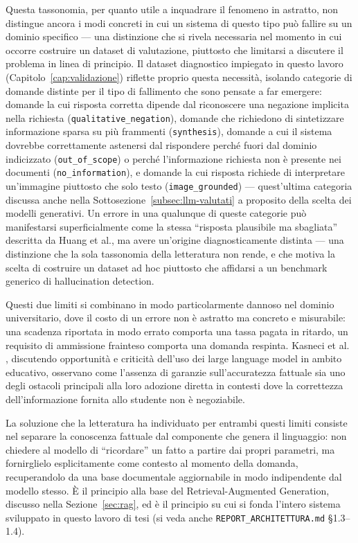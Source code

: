 Questa tassonomia, per quanto utile a inquadrare il fenomeno in astratto, non distingue ancora i modi concreti in cui
un sistema di questo tipo può fallire su un dominio specifico --- una distinzione che si rivela necessaria nel
momento in cui occorre costruire un dataset di valutazione, piuttosto che limitarsi a discutere il problema in linea
di principio. Il dataset diagnostico impiegato in questo lavoro (Capitolo~\ref{cap:validazione}) riflette proprio
questa necessità, isolando categorie di domande distinte per il tipo di fallimento che sono pensate a far emergere:
domande la cui risposta corretta dipende dal riconoscere una negazione implicita nella richiesta
(\texttt{qualitative\_negation}), domande che richiedono di sintetizzare informazione sparsa su più frammenti
(\texttt{synthesis}), domande a cui il sistema dovrebbe correttamente astenersi dal rispondere perché fuori dal
dominio indicizzato (\texttt{out\_of\_scope}) o perché l'informazione richiesta non è presente nei documenti
(\texttt{no\_information}), e domande la cui risposta richiede di interpretare un'immagine piuttosto che solo testo
(\texttt{image\_grounded}) --- quest'ultima categoria discussa anche nella Sottosezione~\ref{subsec:llm-valutati} a
proposito della scelta dei modelli generativi. Un errore in una qualunque di queste categorie può manifestarsi
superficialmente come la stessa ``risposta plausibile ma sbagliata'' descritta da Huang et al., ma avere un'origine
diagnosticamente distinta --- una distinzione che la sola tassonomia della letteratura non rende, e che motiva la
scelta di costruire un dataset ad hoc piuttosto che affidarsi a un benchmark generico di hallucination detection.

Questi due limiti si combinano in modo particolarmente dannoso nel dominio universitario, dove il costo di un errore
non è astratto ma concreto e misurabile: una scadenza riportata in modo errato comporta una tassa pagata in ritardo,
un requisito di ammissione frainteso comporta una domanda respinta. Kasneci et al. \cite{kasneci2023chatgpt},
discutendo opportunità e criticità dell'uso dei large language model in ambito educativo, osservano come l'assenza di
garanzie sull'accuratezza fattuale sia uno degli ostacoli principali alla loro adozione diretta in contesti dove la
correttezza dell'informazione fornita allo studente non è negoziabile.

La soluzione che la letteratura ha individuato per entrambi questi limiti consiste nel separare la conoscenza
fattuale dal componente che genera il linguaggio: non chiedere al modello di ``ricordare'' un fatto a partire dai
propri parametri, ma fornirglielo esplicitamente come contesto al momento della domanda, recuperandolo da una base
documentale aggiornabile in modo indipendente dal modello stesso. È il principio alla base del
Retrieval-Augmented Generation, discusso nella Sezione~\ref{sec:rag}, ed è il principio su cui si fonda l'intero
sistema sviluppato in questo lavoro di tesi (si veda anche \texttt{REPORT\_ARCHITETTURA.md} \S1.3--1.4).

